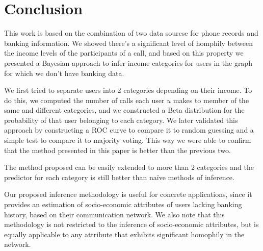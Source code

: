 \section{Conclusion}

This work is based on the combination of two data sourcse for phone records and banking information. We showed there's a significant level of homphily between the income levels of the participants of a call, and based on this property we presented a Bayesian approach to infer income categories for users in the graph for which we don't have banking data.

We first tried to separate users into 2 categories depending on their income. To do this, we computed the number of calls each user \( u \) makes to member of the same and different categories, and we constructed a Beta distribution for the probability of that user belonging to each category. We later validated this approach by constructing a ROC curve to compare it to random guessing and a simple test to compare it to majority voting. This way we were able to confirm that the method presented in this paper is better than the previous two.

The method proposed can be easily extended to more than 2 categories and the predictor for each category is still better than naïve methods of inference.

Our proposed inference methodology is useful for concrete applications, since it provides an estimation of socio-economic attributes of users lacking banking history, based on their communication network. We also note that this methodology is not restricted to the inference of socio-economic attributes, but is equally applicable to any attribute that exhibits significant homophily in the network.








